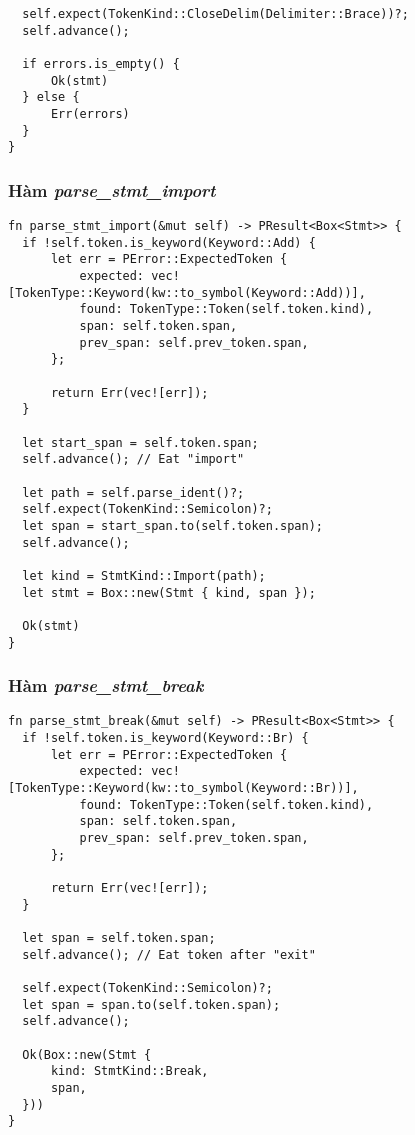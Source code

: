 {\begin{lstlisting}
  self.expect(TokenKind::CloseDelim(Delimiter::Brace))?;
  self.advance();

  if errors.is_empty() {
      Ok(stmt)
  } else {
      Err(errors)
  }
}
\end{lstlisting}

\subsubsection{Hàm \textit{parse\_stmt\_import}}
\label{ap1:stmt_add}
\begin{lstlisting}
fn parse_stmt_import(&mut self) -> PResult<Box<Stmt>> {
  if !self.token.is_keyword(Keyword::Add) {
      let err = PError::ExpectedToken {
          expected: vec![TokenType::Keyword(kw::to_symbol(Keyword::Add))],
          found: TokenType::Token(self.token.kind),
          span: self.token.span,
          prev_span: self.prev_token.span,
      };

      return Err(vec![err]);
  }

  let start_span = self.token.span;
  self.advance(); // Eat "import"

  let path = self.parse_ident()?;
  self.expect(TokenKind::Semicolon)?;
  let span = start_span.to(self.token.span);
  self.advance();

  let kind = StmtKind::Import(path);
  let stmt = Box::new(Stmt { kind, span });

  Ok(stmt)
}
\end{lstlisting}

\subsubsection{Hàm \textit{parse\_stmt\_break}}
\label{ap1:stmt_br}
\begin{lstlisting}
fn parse_stmt_break(&mut self) -> PResult<Box<Stmt>> {
  if !self.token.is_keyword(Keyword::Br) {
      let err = PError::ExpectedToken {
          expected: vec![TokenType::Keyword(kw::to_symbol(Keyword::Br))],
          found: TokenType::Token(self.token.kind),
          span: self.token.span,
          prev_span: self.prev_token.span,
      };

      return Err(vec![err]);
  }

  let span = self.token.span;
  self.advance(); // Eat token after "exit"

  self.expect(TokenKind::Semicolon)?;
  let span = span.to(self.token.span);
  self.advance();

  Ok(Box::new(Stmt {
      kind: StmtKind::Break,
      span,
  }))
}
\end{lstlisting}

}
